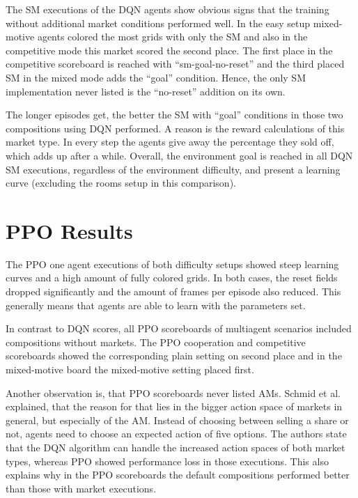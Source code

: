 The SM executions of the DQN agents show obvious signs that the training without additional market conditions performed well. In the easy setup mixed-motive agents colored the most grids with only the SM and also in the competitive mode this market scored the second place. The first place in the competitive scoreboard is reached with ``sm-goal-no-reset'' and the third placed SM in the mixed mode adds the ``goal'' condition. Hence, the only SM implementation never listed is the ``no-reset'' addition on its own.

The longer episodes get, the better the SM with ``goal'' conditions in those two compositions using DQN performed. A reason is the reward calculations of this market type. In every step the agents give away the percentage they sold off, which adds up after a while. Overall, the environment goal is reached in all DQN SM executions, regardless of the environment difficulty, and present a learning curve (excluding the rooms setup in this comparison).

\section{PPO Results}\label{ppo_results}
The PPO one agent executions of both difficulty setups showed steep learning curves and a high amount of fully colored grids. In both cases, the reset fields dropped significantly and the amount of frames per episode also reduced. This generally means that agents are able to learn with the parameters set.

In contrast to DQN scores, all PPO scoreboards of multiagent scenarios included compositions without markets. The PPO cooperation and competitive scoreboards showed the corresponding plain setting on second place and in the mixed-motive board the mixed-motive setting placed first.

Another observation is, that PPO scoreboards never listed AMs. Schmid et al. \cite{scbe21} explained, that the reason for that lies in the bigger action space of markets in general, but especially of the AM. Instead of choosing between selling a share or not, agents need to choose an expected action of five options. The authors state that the DQN algorithm can handle the increased action spaces of both market types, whereas PPO showed performance loss in those executions. This also explains why in the PPO scoreboards the default compositions performed better than those with market executions. 


